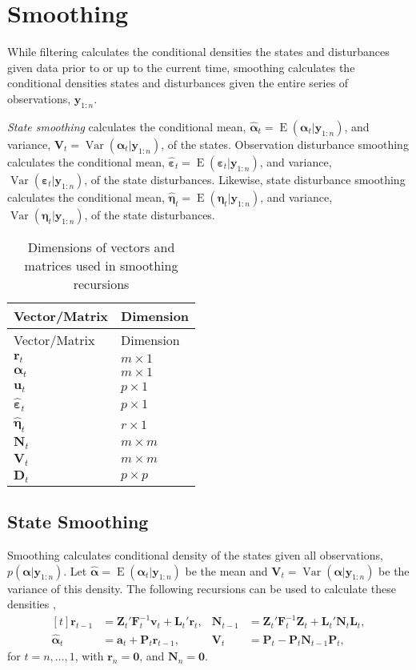 \documentclass[]{book}
\DeclareMathOperator{\E}{E}
\DeclareMathOperator{\Var}{Var}
\newcommand{\mat}[1]{\boldsymbol{#1}}
\renewcommand{\vec}[1]{\boldsymbol{#1}}
\renewcommand{\T}{'}
\begin{document}
\section{Smoothing}\label{smoothing}

While filtering calculates the conditional densities the states and
disturbances given data prior to or up to the current time, smoothing
calculates the conditional densities states and disturbances given the
entire series of observations, \(\vec{y}_{1:n}\).

\emph{State smoothing} calculates the conditional mean,
\(\hat{\vec{\alpha}}_t = \E(\vec{\alpha}_t | \vec{y}_{1:n})\), and
variance, \(\mat{V}_t = \Var(\vec{\alpha}_t | \vec{y}_{1:n})\), of the
states. Observation disturbance smoothing calculates the conditional
mean,
\(\hat{\vec{\varepsilon}}_t = \E(\vec{\varepsilon}_t | \vec{y}_{1:n})\),
and variance, \(\Var(\vec{\varepsilon}_t | \vec{y}_{1:n})\), of the
state disturbances. Likewise, state disturbance smoothing calculates the
conditional mean,
\(\hat{\vec{\eta}}_t = \E(\vec{\eta}_t | \vec{y}_{1:n})\), and variance,
\(\Var(\vec{\eta}_t | \vec{y}_{1:n})\), of the state disturbances.

\begin{longtable}[c]{@{}ll@{}}
\caption{Dimensions of vectors and matrices used in smoothing
recursions}\tabularnewline
\toprule
Vector/Matrix & Dimension\tabularnewline
\midrule
\endfirsthead
\toprule
Vector/Matrix & Dimension\tabularnewline
\midrule
\endhead
\(\vec{r}_t\) & \(m \times 1\)\tabularnewline
\(\vec{\vec{\alpha}}_t\) & \(m \times 1\)\tabularnewline
\(\vec{u}_t\) & \(p \times 1\)\tabularnewline
\(\hat{\vec{\varepsilon}}_t\) & \(p \times 1\)\tabularnewline
\(\hat{\vec{\eta}}_t\) & \(r \times 1\)\tabularnewline
\(\mat{N}_t\) & \(m \times m\)\tabularnewline
\(\mat{V}_t\) & \(m \times m\)\tabularnewline
\(\mat{D}_t\) & \(p \times p\)\tabularnewline
\bottomrule
\end{longtable}

\subsection{State Smoothing}\label{state-smoothing}

Smoothing calculates conditional density of the states given all
observations, \(p(\vec{\alpha} | \vec{y}_{1:n})\). Let
\(\hat{\vec{\alpha}} = \E(\vec{\alpha}_t | \vec{y}_{1:n})\) be the mean
and \(\mat{V}_t = \Var(\vec{\alpha} | \vec{y}_{1:n})\) be the variance
of this density. The following recursions can be used to calculate these
densities \autocite[Sec 4.4.4]{DurbinKoopman2012}, \[
\begin{aligned}[t]
\vec{r}_{t - 1} &= \mat{Z}_t\T \mat{F}_t^{-1} \vec{v}_t + \mat{L}_t\T \vec{r}_t , &
\mat{N}_{t - 1} &= \mat{Z}_t\T \mat{F}_t^{-1} \mat{Z}_t + \mat{L}_t\T \mat{N}_t \mat{L}_t, \\
\hat{\vec{\alpha}}_t &= \vec{a}_t + \mat{P}_t \vec{r}_{t - 1} , &
\mat{V}_t &= \mat{P}_t - \mat{P}_t \mat{N}_{t - 1} \mat{P}_t ,
\end{aligned}
\] for \(t = n, \dots, 1\), with \(\vec{r}_n = \vec{0}\), and
\(\mat{N}_n = \mat{0}\).
\end{document}
